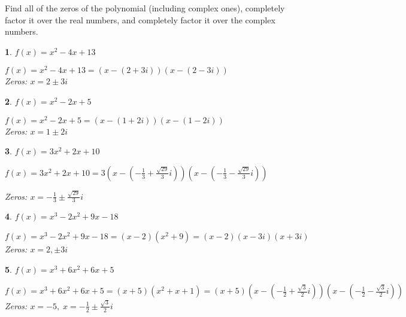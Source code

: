 \documentclass{amsbook}
\newtheorem{exc}{}
\newenvironment{ex}{\begin{exc}\normalfont}{\end{exc}}
\numberwithin{section}{chapter}
\numberwithin{equation}{chapter}
\begin{document}
Find all of the zeros of the polynomial (including complex ones), completely factor it over the real numbers, and completely factor it over the complex numbers.

\begin{multicols}{2}

\begin{ex}
	$f(x) = x^2-4x+13$
	\begin{sol}
		$f(x) = x^2-4x+13 = (x-(2+3i)) (x-(2-3i))$ \\
		Zeros: $x = 2 \pm 3i$ 
	\end{sol}
\end{ex}


\begin{ex}
	$f(x) = x^2 - 2x + 5$
	\begin{sol}
		$f(x) = x^2 - 2x + 5 = (x-(1+2i))(x-(1-2i))$ \\ 
		Zeros:  $x = 1 \pm 2i$
	\end{sol}
\end{ex}


\begin{ex}
	$f(x) = 3x^2 + 2x +10$
	\begin{sol}
		$f(x) = 3x^2 + 2x +10 = 3\left(x-\left(-\frac{1}{3} + \frac{\sqrt{29}}{3} i\right) \right) \left(x-\left(-\frac{1}{3} - \frac{\sqrt{29}}{3} i\right) \right)$
		
		Zeros:  $x = -\frac{1}{3} \pm \frac{\sqrt{29}}{3} i$
	\end{sol}
\end{ex}


\begin{ex}
	$f(x) = x^3-2x^2+9x-18 $
	\begin{sol}
		$f(x) = x^3-2x^2+9x-18 = (x-2) \left(x^2+9\right) = (x-2)(x-3i)(x+3i)$\\
		Zeros:  $x=2, \pm 3i$
	\end{sol}
\end{ex}


\begin{ex}
	$f(x) = x^{3} + 6x^{2} + 6x + 5$
	\begin{sol}
		 $f(x) = x^{3} + 6x^{2} + 6x + 5 = (x + 5)(x^{2} + x + 1) = (x + 5) \left( x - \left( -\frac{1}{2} + \frac{\sqrt{3}}{2}i \right) \right) \left( x - \left(-\frac{1}{2} - \frac{\sqrt{3}}{2}i \right) \right)$ \\
		Zeros: $x = -5, \;  x = -\frac{1}{2} \pm \frac{\sqrt{3}}{2}i $
	\end{sol}
\end{ex}



\end{multicols}
\end{document}
